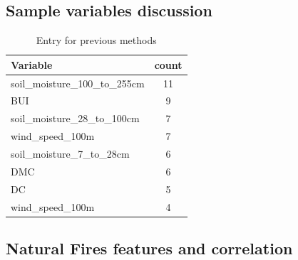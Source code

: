\subsection{Sample variables discussion}
\begin{table}[H]
	\caption{Entry for previous methods}
	\centering
	\label{entries_samples}
	\begin{tabular}{lc}
		\hline
		Variable                       & \multicolumn{1}{l}{count} \\ \hline
		soil\_moisture\_100\_to\_255cm                             & 11                         \\
		BUI                            & 9                          \\
		soil\_moisture\_28\_to\_100cm & 7                          \\
		wind\_speed\_100m                            & 7                          \\
		soil\_moisture\_7\_to\_28cm             & 6   \\
		DMC & 6 \\
		DC & 5 \\
		wind\_speed\_100m & 4 \\                
	\end{tabular}
\end{table}



\subsection{Natural Fires features and correlation}

